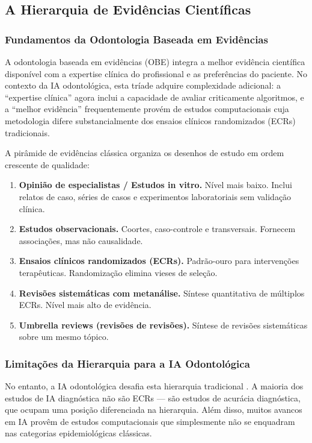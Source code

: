 \subsection{A Hierarquia de Evidências Científicas}

\subsubsection{Fundamentos da Odontologia Baseada em Evidências}

A odontologia baseada em evidências (OBE)  integra a melhor evidência científica disponível com a expertise clínica do profissional e as preferências do paciente. No contexto da IA odontológica, esta tríade adquire complexidade adicional: a ``expertise clínica'' agora inclui a capacidade de avaliar criticamente algoritmos, e a ``melhor evidência'' frequentemente provém de estudos computacionais cuja metodologia difere substancialmente dos ensaios clínicos randomizados (ECRs) tradicionais.

A pirâmide de evidências clássica organiza os desenhos de estudo em ordem crescente de qualidade:

\begin{enumerate}
    \item \textbf{Opinião de especialistas / Estudos in vitro.} Nível mais baixo. Inclui relatos de caso, séries de casos e experimentos laboratoriais sem validação clínica.
    \item \textbf{Estudos observacionais.} Coortes, caso-controle e transversais. Fornecem associações, mas não causalidade.
    \item \textbf{Ensaios clínicos randomizados (ECRs).} Padrão-ouro para intervenções terapêuticas. Randomização elimina vieses de seleção.
    \item \textbf{Revisões sistemáticas com metanálise.} Síntese quantitativa de múltiplos ECRs. Nível mais alto de evidência.
    \item \textbf{Umbrella reviews (revisões de revisões).} Síntese de revisões sistemáticas sobre um mesmo tópico.
\end{enumerate}

\subsubsection{Limitações da Hierarquia para a IA Odontológica}

No entanto, a IA odontológica desafia esta hierarquia tradicional . A maioria dos estudos de IA diagnóstica não são ECRs — são estudos de acurácia diagnóstica, que ocupam uma posição diferenciada na hierarquia. Além disso, muitos avancos em IA provêm de estudos computacionais que simplesmente não se enquadram nas categorias epidemiológicas clássicas.

